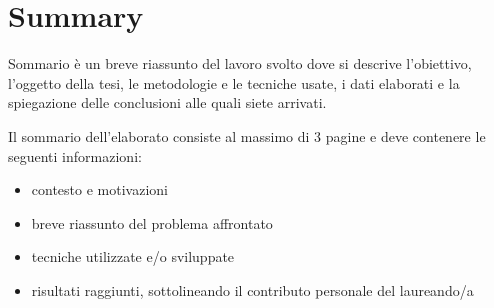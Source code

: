 \chapter*{Summary}
\label{summary}


Sommario è un breve riassunto del lavoro svolto dove si descrive l'obiettivo, l'oggetto della tesi, le
metodologie e le tecniche usate, i dati elaborati e la spiegazione delle conclusioni alle quali siete arrivati.

Il sommario dell’elaborato consiste al massimo di 3 pagine e deve contenere le seguenti informazioni:
\begin{itemize}
  \item contesto e motivazioni
  \item breve riassunto del problema affrontato
  \item tecniche utilizzate e/o sviluppate
  \item risultati raggiunti, sottolineando il contributo personale del laureando/a
\end{itemize}




